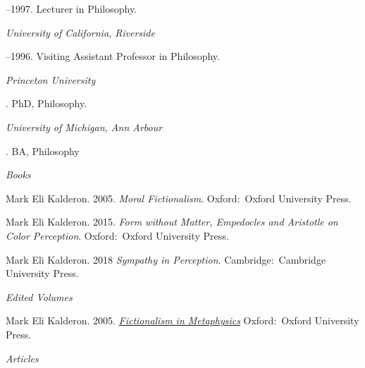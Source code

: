 \documentclass[11pt]{article}
\begin{document}
--1997. Lecturer in Philosophy.

\medskip
\noindent\emph{University of California, Riverside \vspace{0.01in}}

--1996. Visiting Assistant Professor in Philosophy.


\bigskip



\noindent\emph{Princeton University \vspace{0.01in}}

. PhD, Philosophy.

\medskip
\noindent\emph{University of Michigan, Ann Arbour\vspace{0.02in}}

. BA, Philosophy

\bigskip
 
\medskip
\noindent\emph{Books \vspace{0.01in}}

\ind Mark Eli Kalderon. 2005. \emph{Moral Fictionalism}. Oxford:~Oxford University Press. %

\ind Mark Eli Kalderon. 2015. \emph{Form without Matter, Empedocles and Aristotle on Color Perception}. Oxford:~Oxford University Press. %

\ind Mark Eli Kalderon. 2018
\emph{Sympathy in Perception}. Cambridge:~Cambridge University Press. %

\medskip
\noindent\emph{Edited Volumes \vspace{0.01in}}

\ind Mark Eli Kalderon. 2005. \emph{\href{http://ukcatalogue.oup.com/product/9780199282180.do}{Fictionalism in Metaphysics}} Oxford:~Oxford University Press. %
 
\normalsize

\bigskip
\noindent\emph{Articles \vspace{0.05in}}
 
\end{document}
